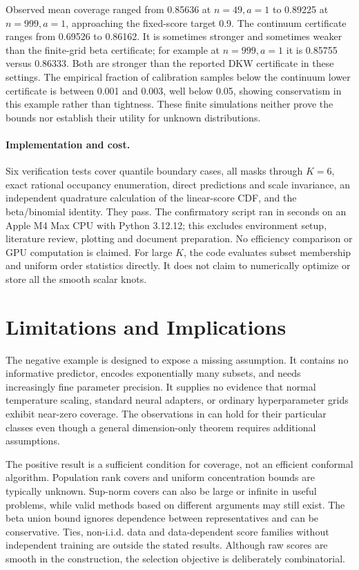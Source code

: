 \documentclass{article}
\begin{document}
Observed mean coverage ranged from 0.85636 at $n=49,a=1$ to 0.89225 at $n=999,a=1$, approaching the fixed-score target 0.9. The continuum certificate ranges from 0.69526 to 0.86162. It is sometimes stronger and sometimes weaker than the finite-grid beta certificate; for example at $n=999,a=1$ it is 0.85755 versus 0.86333. Both are stronger than the reported DKW certificate in these settings. The empirical fraction of calibration samples below the continuum lower certificate is between 0.001 and 0.003, well below 0.05, showing conservatism in this example rather than tightness. These finite simulations neither prove the bounds nor establish their utility for unknown distributions.

\paragraph{Implementation and cost.}
Six verification tests cover quantile boundary cases, all masks through $K=6$, exact rational occupancy enumeration, direct predictions and scale invariance, an independent quadrature calculation of the linear-score CDF, and the beta/binomial identity. They pass. The confirmatory script ran in \RunSeconds{} seconds on an Apple M4 Max CPU with Python 3.12.12; this excludes environment setup, literature review, plotting and document preparation. No efficiency comparison or GPU computation is claimed. For large $K$, the code evaluates subset membership and uniform order statistics directly. It does not claim to numerically optimize or store all the smooth scalar knots.

\section{Limitations and Implications}

The negative example is designed to expose a missing assumption. It contains no informative predictor, encodes exponentially many subsets, and needs increasingly fine parameter precision. It supplies no evidence that normal temperature scaling, standard neural adapters, or ordinary hyperparameter grids exhibit near-zero coverage. The observations in \citet{zeng2025} can hold for their particular classes even though a general dimension-only theorem requires additional assumptions.

The positive result is a sufficient condition for coverage, not an efficient conformal algorithm. Population rank covers and uniform concentration bounds are typically unknown. Sup-norm covers can also be large or infinite in useful problems, while valid methods based on different arguments may still exist. The beta union bound ignores dependence between representatives and can be conservative. Ties, non-i.i.d. data and data-dependent score families without independent training are outside the stated results. Although raw scores are smooth in the construction, the selection objective is deliberately combinatorial.
\end{document}
